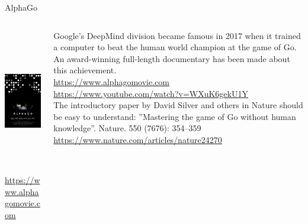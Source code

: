 \documentclass[ignorenonframetext,xcolor=x11names]{beamer}
\begin{document}
\begin{frame}{AlphaGo}
\footnotesize
\begin{columns}
\begin{column}{0.45\textwidth}
\begin{center}
\includegraphics[height=2.5in]{screen2} \\
\tiny \url{https://www.alphagomovie.com} \footnotesize
\end{center}
\end{column}
\begin{column}{0.55\textwidth}
Google's DeepMind division became famous in 2017 when it trained a computer to beat the human world champion at the game of Go. An award-winning full-length documentary has been made about this achievement. \\
\vspace{\baselineskip}
\url{https://www.alphagomovie.com} \\
\url{https://www.youtube.com/watch?v=WXuK6gekU1Y} \\
\vspace{\baselineskip}
The introductory paper by David Silver and others in Nature should be easy to understand: ''Mastering the game of Go without human knowledge''. Nature. 550 (7676): 354--359\\ \url{https://www.nature.com/articles/nature24270}
\end{column}
\end{columns}
\end{frame}
\end{document}
